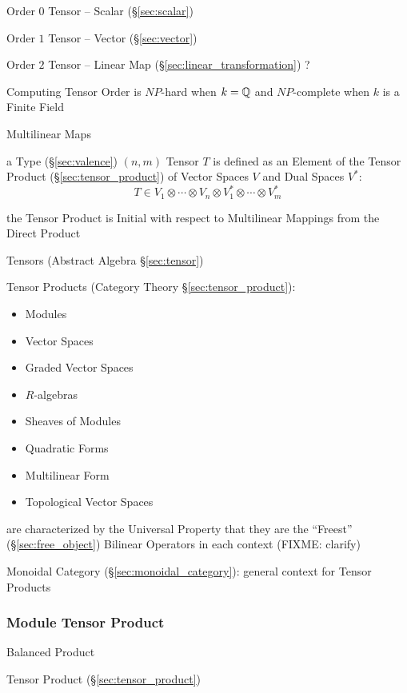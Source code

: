 Order $0$ Tensor -- Scalar (\S\ref{sec:scalar})

Order $1$ Tensor -- Vector (\S\ref{sec:vector})

Order $2$ Tensor -- Linear Map (\S\ref{sec:linear_transformation}) ?

Computing Tensor Order is $NP$-hard when $k = \mathbb{Q}$ and $NP$-complete
when $k$ is a Finite Field %


\asterism


Multilinear Maps


\asterism


a Type (\S\ref{sec:valence}) $(n,m)$ Tensor $T$ is defined as an
Element of the Tensor Product (\S\ref{sec:tensor_product}) of Vector
Spaces $V$ and Dual Spaces $V^*$:
\[
  T \in V_1 \otimes \cdots \otimes V_n
    \otimes V^*_1 \otimes \cdots \otimes V^*_m
\]

the Tensor Product is Initial with respect to Multilinear Mappings
from the Direct Product

Tensors (Abstract Algebra \S\ref{sec:tensor})

Tensor Products (Category Theory \S\ref{sec:tensor_product}):
\begin{itemize}
  \item Modules
  \item Vector Spaces
  \item Graded Vector Spaces
  \item $R$-algebras
  \item Sheaves of Modules
  \item Quadratic Forms
  \item Multilinear Form
  \item Topological Vector Spaces
\end{itemize}
are characterized by the Universal Property that they are the ``Freest''
(\S\ref{sec:free_object}) Bilinear Operators in each context
(FIXME: clarify)

Monoidal Category (\S\ref{sec:monoidal_category}): general context for
Tensor Products



\subsubsection{Module Tensor Product}\label{sec:module_tensor_product}

Balanced Product

\fist Tensor Product (\S\ref{sec:tensor_product})



